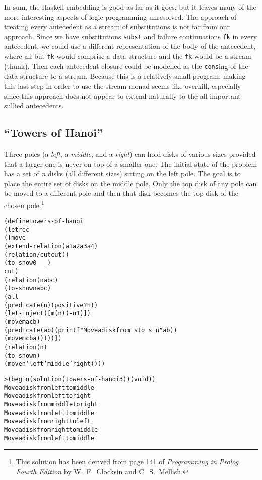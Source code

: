 In sum, the Haskell embedding is good as far as it goes, but it
leaves many of the more interesting aspects of logic programming
unresolved.  The approach of treating every antecedent as a stream
of substitutions is not far from our approach.  Since we have
substitutions \texttt{subst} and failure continuations \texttt{fk}
in every antecedent, we could use a different representation of the
body of the antecedent, where all but \texttt{fk} would comprise
a data structure and the \texttt{fk} would be a stream (thunk).
Then each antecedent closure could be modelled as the \texttt{cons}ing
of the data structure to a stream.  Because this is a relatively
small program, making this last step in order to use the stream
monad seems like overkill, especially since this approach does not
appear to extend naturally to the all important sullied antecedents.

\subsection{``Towers of Hanoi''}

Three poles (a \emph{left}, a \emph{middle}, and a \emph{right}) can hold
disks of various sizes provided that a larger one is never on top of a
smaller one.  The initial state of the problem has a set of \emph{n}
disks (all different sizes) sitting on the left pole.  The goal is to
place the entire set of disks on the middle pole.  Only the top disk
of any pole can be moved to a different pole and then that disk
becomes the top disk of the chosen pole.\footnote{This solution has been derived from
page 141 of \emph{Programming in Prolog Fourth Edition} by
W.\ F.\ Clocksin and C.\ S.\ Mellish.}
\begin{alltt}
(define towers-of-hanoi
  (letrec
      ([move
         (extend-relation (a1 a2 a3 a4)
           (relation/cut cut ()
             (to-show 0 _ _ _)
             cut)
           (relation (n a b c)
             (to-show n a b c)
             (all
               (predicate (n) (positive? n))
               (let-inject ([m (n) (- n 1)])
                 (move m a c b)
                 (predicate (a b) (printf "Move a disk from ~s to ~s~n" a b))
                 (move m c b a)))))])
    (relation (n)
      (to-show n)
      (move n 'left 'middle 'right))))
\end{alltt}

\begin{alltt}
> (begin (solution (towers-of-hanoi 3)) (void))
Move a disk from left to middle
Move a disk from left to right
Move a disk from middle to right
Move a disk from left to middle
Move a disk from right to left
Move a disk from right to middle
Move a disk from left to middle
\end{alltt}

